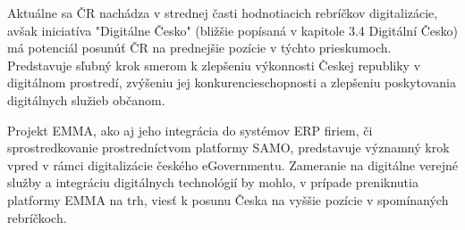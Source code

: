 Aktuálne sa ČR nachádza v strednej časti hodnotiacich rebríčkov digitalizácie, avšak iniciatíva "Digitálne Česko" (bližšie popísaná v kapitole 3.4 Digitální Česko) má potenciál posunúť ČR na prednejšie pozície v týchto prieskumoch. Predstavuje sľubný krok smerom k zlepšeniu výkonnosti Českej republiky v digitálnom prostredí, zvýšeniu jej konkurencieschopnosti a zlepšeniu poskytovania digitálnych služieb občanom.

Projekt EMMA, ako aj jeho integrácia do systémov ERP firiem, či sprostredkovanie prostredníctvom platformy SAMO, predstavuje významný krok vpred v rámci digitalizácie českého eGovernmentu. Zameranie na digitálne verejné služby a integráciu digitálnych technológií by mohlo, v prípade preniknutia platformy EMMA na trh, viesť k posunu Česka na vyššie pozície v spomínaných rebríčkoch.


%
%
%

